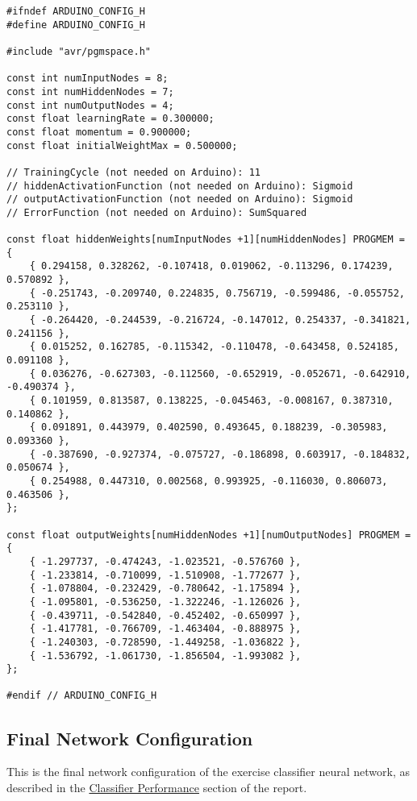 \documentclass[a4paper]{article}
\begin{document}
\begin{lstlisting}
#ifndef ARDUINO_CONFIG_H
#define ARDUINO_CONFIG_H

#include "avr/pgmspace.h"

const int numInputNodes = 8;
const int numHiddenNodes = 7;
const int numOutputNodes = 4;
const float learningRate = 0.300000;
const float momentum = 0.900000;
const float initialWeightMax = 0.500000;

// TrainingCycle (not needed on Arduino): 11
// hiddenActivationFunction (not needed on Arduino): Sigmoid
// outputActivationFunction (not needed on Arduino): Sigmoid
// ErrorFunction (not needed on Arduino): SumSquared

const float hiddenWeights[numInputNodes +1][numHiddenNodes] PROGMEM = {
    { 0.294158, 0.328262, -0.107418, 0.019062, -0.113296, 0.174239, 0.570892 }, 
    { -0.251743, -0.209740, 0.224835, 0.756719, -0.599486, -0.055752, 0.253110 }, 
    { -0.264420, -0.244539, -0.216724, -0.147012, 0.254337, -0.341821, 0.241156 }, 
    { 0.015252, 0.162785, -0.115342, -0.110478, -0.643458, 0.524185, 0.091108 }, 
    { 0.036276, -0.627303, -0.112560, -0.652919, -0.052671, -0.642910, -0.490374 }, 
    { 0.101959, 0.813587, 0.138225, -0.045463, -0.008167, 0.387310, 0.140862 }, 
    { 0.091891, 0.443979, 0.402590, 0.493645, 0.188239, -0.305983, 0.093360 }, 
    { -0.387690, -0.927374, -0.075727, -0.186898, 0.603917, -0.184832, 0.050674 }, 
    { 0.254988, 0.447310, 0.002568, 0.993925, -0.116030, 0.806073, 0.463506 }, 
};

const float outputWeights[numHiddenNodes +1][numOutputNodes] PROGMEM = {
    { -1.297737, -0.474243, -1.023521, -0.576760 }, 
    { -1.233814, -0.710099, -1.510908, -1.772677 }, 
    { -1.078804, -0.232429, -0.780642, -1.175894 }, 
    { -1.095801, -0.536250, -1.322246, -1.126026 }, 
    { -0.439711, -0.542840, -0.452402, -0.650997 }, 
    { -1.417781, -0.766709, -1.463404, -0.888975 }, 
    { -1.240303, -0.728590, -1.449258, -1.036822 }, 
    { -1.536792, -1.061730, -1.856504, -1.993082 }, 
};

#endif // ARDUINO_CONFIG_H
\end{lstlisting}

\subsection{Final Network Configuration}%
\label{subsec:a2_finalconfig}

This is the final network configuration of the exercise classifier neural network, as described in the \hyperref[subsec:ev_cp]{Classifier Performance} section of the report.
\end{document}
